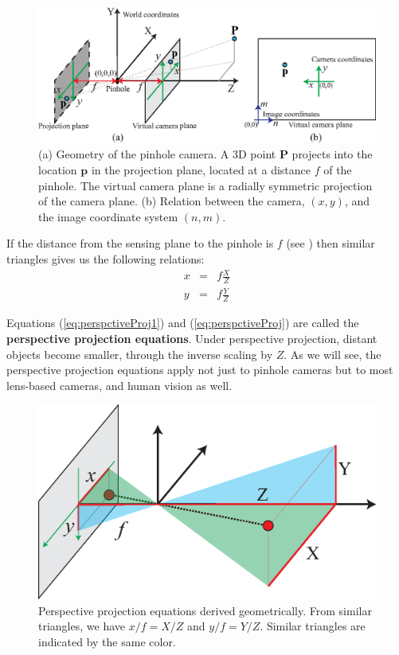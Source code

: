 \begin{figure}[t]
\centerline{
\includegraphics[width=1\linewidth]{figures/imaging/pinhole_geometry2.eps}
}
\caption{(a) Geometry of the pinhole camera. A 3D point $\mathbf{P}$ projects into the location $\mathbf{p}$ in the projection plane, located at a distance $f$ of the pinhole. The virtual camera plane is a radially symmetric projection of the camera plane. (b) Relation between the camera, $(x,y)$, and the image coordinate system $(n,m)$.}
\label{fig:pinholeGeometry}
\end{figure}


If the distance from the sensing plane to the pinhole is $f$ (see \fig{\ref{fig:pinholeGeometry2}})
then similar triangles
gives us the following relations:
\begin{eqnarray} 
x & = & f \frac{X}{Z} 
\label{eq:perspctiveProj1} \\
y & = & f \frac{Y}{Z} 
\label{eq:perspctiveProj}
\end{eqnarray} 

Equations (\ref{eq:perspctiveProj1}) and (\ref{eq:perspctiveProj}) are called the {\bf perspective projection
equations}.  Under perspective projection, distant objects become
smaller, through the inverse scaling by $Z$.  As we will see, the perspective projection
equations apply not just to pinhole cameras but to most lens-based cameras, and
human vision as well. 



\begin{figure}[t]
\centerline{
\includegraphics[width=.7\linewidth]{figures/imaging/similar_triangles2.eps}
}
\caption{Perspective projection equations derived geometrically. From similar triangles, we have $x/f = X/Z$ and $y/f = Y/Z$. Similar triangles are indicated by the same color.}
\label{fig:pinholeGeometry2}
\end{figure}

